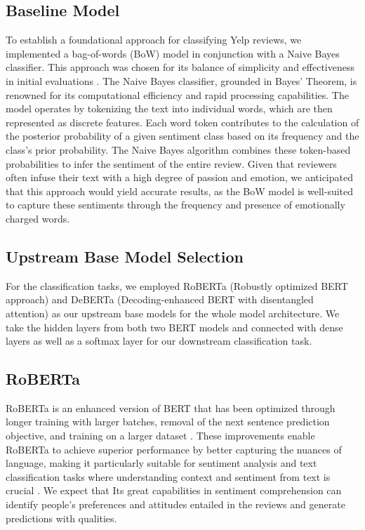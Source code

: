 \documentclass[12pt]{article}
\begin{document}
\subsection{Baseline Model}
To establish a foundational approach for classifying Yelp reviews, we implemented a bag-of-words (BoW) model in conjunction with a Naive Bayes classifier. This approach was chosen for its balance of simplicity and effectiveness in initial evaluations \citep{rish2001empirical}. The Naive Bayes classifier, grounded in Bayes' Theorem, is renowned for its computational efficiency and rapid processing capabilities. The model operates by tokenizing the text into individual words, which are then represented as discrete features. Each word token contributes to the calculation of the posterior probability of a given sentiment class based on its frequency and the class's prior probability. The Naive Bayes algorithm combines these token-based probabilities to infer the sentiment of the entire review. Given that reviewers often infuse their text with a high degree of passion and emotion, we anticipated that this approach would yield accurate results, as the BoW model is well-suited to capture these sentiments through the frequency and presence of emotionally charged words.

\subsection{Upstream Base Model Selection}
For the classification tasks, we employed RoBERTa (Robustly optimized BERT approach) and DeBERTa (Decoding-enhanced BERT with disentangled attention) as our upstream base models for the whole model architecture. We take the hidden layers from both two BERT models and connected with dense layers as well as a softmax layer for our downstream classification task. 

\subsection{RoBERTa}
RoBERTa is an enhanced version of BERT that has been optimized through longer training with larger batches, removal of the next sentence prediction objective, and training on a larger dataset \citep{liu2012sentiment}. These improvements enable RoBERTa to achieve superior performance by better capturing the nuances of language, making it particularly suitable for sentiment analysis and text classification tasks where understanding context and sentiment from text is crucial \citep{liu2012sentiment}. We expect that Its great capabilities in sentiment comprehension can identify people’s preferences and attitudes entailed in the reviews and generate predictions with qualities.
\end{document}
